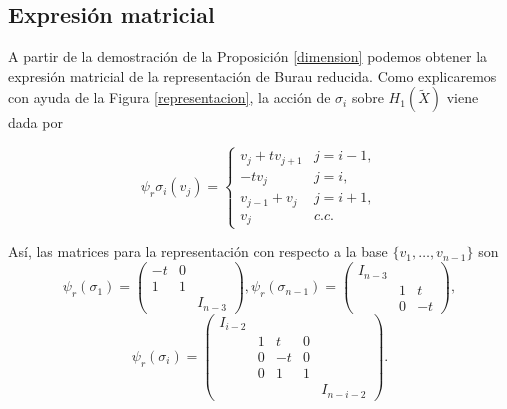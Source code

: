 \documentclass[TFG.tex]{subfiles}
\begin{document}
\subsection{Expresión matricial}
A partir de la demostración de la Proposición \ref{dimension} podemos obtener la expresión matricial de la representación de Burau reducida. Como explicaremos con ayuda de la Figura \ref{representacion}, la acción de $\sigma_i$ sobre $H_1(\widetilde{X})$ viene dada por

\[
\psi_r\sigma_i(v_j)=\begin{cases}
v_j+tv_{j+1} & j=i-1,\\
-tv_j & j=i,\\
v_{j-1}+v_j & j=i+1,\\
v_j & c.c.
\end{cases}
\]

Así, las matrices para la representación con respecto a la base $\{v_1,\dots, v_{n-1}\}$ son
\[
\psi_r(\sigma_1)=\begin{pmatrix}
-t & 0 & \\
1 & 1 & \\
& & I_{n-3}
\end{pmatrix}, \psi_r(\sigma_{n-1})=\begin{pmatrix}
I_{n-3} & &\\
& 1 & t \\
& 0 & -t 
\end{pmatrix},
\]
\[
\psi_r(\sigma_i )=\begin{pmatrix}
I_{i-2} & & &\\
& 1 & t & 0 & \\
& 0 & -t & 0 & \\
& 0 & 1 & 1 & \\
& & & & I_{n-i-2}  
\end{pmatrix}.
\]
\end{document}

